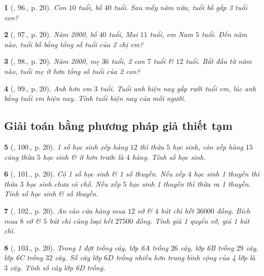 \documentclass{article}
\newtheorem{baitoan}{}
\begin{document}
\begin{baitoan}[\cite{Binh_Toan_6_tap_1}, 96., p. 20]
	Con $10$ tuổi, bố $40$ tuổi. Sau mấy năm nữa, tuổi bố gấp 3 tuổi con?
\end{baitoan}

\begin{baitoan}[\cite{Binh_Toan_6_tap_1}, 97., p. 20]
	Năm 2000, bố $40$ tuổi, Mai $11$ tuổi, em Nam $5$ tuổi. Đến năm nào, tuổi bố bằng tổng số tuổi của 2 chị em?
\end{baitoan}

\begin{baitoan}[\cite{Binh_Toan_6_tap_1}, 98., p. 20]
	Năm 2000, mẹ $36$ tuổi, 2 con $7$ tuổi \& $12$ tuổi. Bắt đầu từ năm nào, tuổi mẹ ít hơn tổng số tuổi của 2 con?
\end{baitoan}

\begin{baitoan}[\cite{Binh_Toan_6_tap_1}, 99., p. 20]
	Anh hơn em $3$ tuổi. Tuổi anh hiện nay gấp rưỡi tuổi em, lúc anh bằng tuổi em hiện nay. Tính tuổi hiện nay của mỗi người.
\end{baitoan}

\subsection{Giải toán bằng phương pháp giả thiết tạm}

\begin{baitoan}[\cite{Binh_Toan_6_tap_1}, 100., p. 20]
	1 số học sinh xếp hàng $12$ thì thừa $5$ học sinh, còn xếp hàng $15$ cũng thừa $5$ học sinh \& ít hơn trước là $4$ hàng. Tính số học sinh.
\end{baitoan}

\begin{baitoan}[\cite{Binh_Toan_6_tap_1}, 101., p. 20]
	Có 1 số học sinh \& 1 số thuyền. Nếu xếp $4$ học sinh 1 thuyền thì thừa $3$ học sinh chưa có chỗ. Nếu xếp $5$ học sinh 1 thuyền thì thừa ra 1 thuyền. Tính số học sinh \& số thuyền.
\end{baitoan}

\begin{baitoan}[\cite{Binh_Toan_6_tap_1}, 102., p. 20]
	An vào cửa hàng mua $12$ vở \& $4$ bút chì hết $36000$ đồng. Bích mua $8$ vở \& $5$ bút chì cùng loại hết $27500$ đồng. Tính giá 1 quyển vở, giá 1 bút chì.
\end{baitoan}

\begin{baitoan}[\cite{Binh_Toan_6_tap_1}, 103., p. 20]
	Trong 1 đợt trồng cây, lớp 6A trồng $26$ cây, lớp 6B trồng $29$ cây, lớp 6C trồng $32$ cây. Số cây lớp $6D$ trồng nhiều hơn trung bình cộng của 4 lớp là $3$ cây. Tính số cây lớp 6D trồng.
\end{baitoan}
\end{document}
